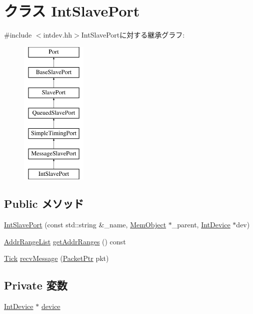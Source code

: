 \hypertarget{classX86ISA_1_1IntDevice_1_1IntSlavePort}{
\section{クラス IntSlavePort}
\label{classX86ISA_1_1IntDevice_1_1IntSlavePort}
}


{\ttfamily \#include $<$intdev.hh$>$}IntSlavePortに対する継承グラフ:\begin{figure}[H]
\begin{center}
\leavevmode
\includegraphics[height=7cm]{classX86ISA_1_1IntDevice_1_1IntSlavePort}
\end{center}
\end{figure}
\subsection*{Public メソッド}
\begin{DoxyCompactItemize}
\item 
\hyperlink{classX86ISA_1_1IntDevice_1_1IntSlavePort_af04466913e558c12860c108bf2f30d00}{IntSlavePort} (const std::string \&\_\-name, \hyperlink{classMemObject}{MemObject} $\ast$\_\-parent, \hyperlink{classX86ISA_1_1IntDevice}{IntDevice} $\ast$dev)
\item 
\hyperlink{classstd_1_1list}{AddrRangeList} \hyperlink{classX86ISA_1_1IntDevice_1_1IntSlavePort_a36cf113d5e5e091ebddb32306c098fae}{getAddrRanges} () const 
\item 
\hyperlink{base_2types_8hh_a5c8ed81b7d238c9083e1037ba6d61643}{Tick} \hyperlink{classX86ISA_1_1IntDevice_1_1IntSlavePort_a3dad3b561a1022eee5fab74df92ce766}{recvMessage} (\hyperlink{classPacket}{PacketPtr} pkt)
\end{DoxyCompactItemize}
\subsection*{Private 変数}
\begin{DoxyCompactItemize}
\item 
\hyperlink{classX86ISA_1_1IntDevice}{IntDevice} $\ast$ \hyperlink{classX86ISA_1_1IntDevice_1_1IntSlavePort_a213401fbaf58b821f38f6e274ddafadc}{device}
\end{DoxyCompactItemize}


